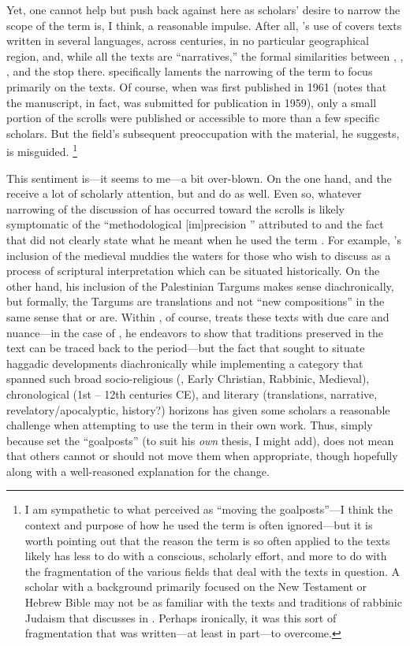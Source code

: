 Yet, one cannot help but push back against \vermes here as scholars' desire to narrow the scope of the term is, I think, a reasonable impulse. After all, \vermes's use of \rwb covers texts written in several languages, across centuries, in no particular geographical region, and, while all the texts are ``narratives,'' the formal similarities between \ga, \ant, \jub, and the \pTarg stop there. \vermes specifically laments the narrowing of the term \rwb to focus primarily on the \dss texts. Of course, when  was first published in 1961 (\vermes notes that the manuscript, in fact, was submitted for publication in 1959), only a small portion of the scrolls were published or accessible to more than a few specific scholars. But the field's subsequent preoccupation with the \qumran material, he suggests, is misguided.%
    \footnote{I am sympathetic to what \vermes perceived as ``moving the goalposts''---I think the context and purpose of how he used the term \rwb is often ignored---but it is worth pointing out that the reason the term \rwb is so often applied to the \qumran texts likely has less to do with a conscious, scholarly effort, and more to do with the fragmentation of the various fields that deal with the texts in question. A scholar with a background primarily focused on the New Testament or Hebrew Bible may not be as familiar with the texts and traditions of rabbinic Judaism that \vermes discusses in . Perhaps ironically, it was this sort of fragmentation that  was written---at least in part---to overcome.} 

This sentiment is---it seems to me---a bit over-blown. On the one hand, \ga and the \templescroll receive a lot of scholarly attention, but \jub and \ant do as well. Even so, whatever narrowing of the discussion of \rwb has occurred toward the \qumran scrolls is likely symptomatic of the ``methodological [im]precision '' attributed to  and the fact that \vermes did not clearly state what he meant when he used the term \rwB. For example, \vermes's inclusion of the medieval \sefer muddies the waters for those who wish to discuss \rwb as a process of scriptural interpretation which can be situated historically. On the other hand, his inclusion of the Palestinian Targums makes sense diachronically, but formally, the Targums are translations and not ``new compositions'' in the same sense that \jub or \ga are. Within , of course, \vermes treats these texts with due care and nuance---in the case of \sefer, he endeavors to show that traditions preserved in the text can be traced back to the \secondtemple period---but the fact that \vermes sought to situate haggadic developments diachronically while implementing a category that spanned such broad socio-religious (\qumran, Early Christian, Rabbinic, Medieval), chronological (1st -- 12th centuries CE), and literary (translations, narrative, revelatory/apocalyptic, history?) horizons has given some scholars a reasonable challenge when attempting to use the term in their own work. Thus, simply because \vermes set the ``goalposts'' (to suit his \emph{own} thesis, I might add), does not mean that others cannot or should not move them when appropriate, though hopefully along with a well-reasoned explanation for the change. 
